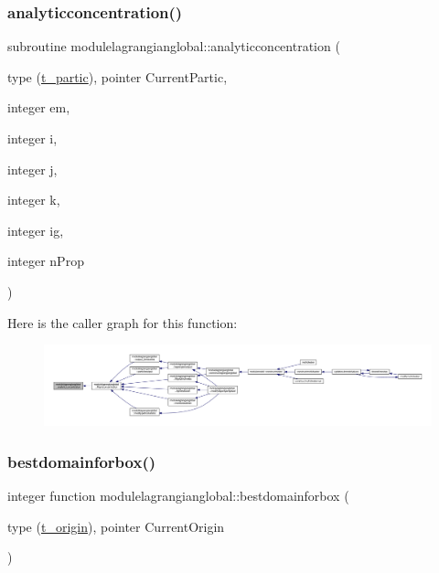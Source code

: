 \subsubsection{\texorpdfstring{analyticconcentration()}{analyticconcentration()}}
{\footnotesize\ttfamily subroutine modulelagrangianglobal\+::analyticconcentration (\begin{DoxyParamCaption}\item[{type (\mbox{\hyperlink{structmodulelagrangianglobal_1_1t__partic}{t\+\_\+partic}}), pointer}]{Current\+Partic,  }\item[{integer}]{em,  }\item[{integer}]{i,  }\item[{integer}]{j,  }\item[{integer}]{k,  }\item[{integer}]{ig,  }\item[{integer}]{n\+Prop }\end{DoxyParamCaption})\hspace{0.3cm}{\ttfamily [private]}}

Here is the caller graph for this function\+:\nopagebreak
\begin{figure}[H]
\begin{center}
\leavevmode
\includegraphics[width=350pt]{namespacemodulelagrangianglobal_a8a4e3b4aa0ee023ec48a0d9e44b5df43_icgraph}
\end{center}
\end{figure}
\mbox{\label{namespacemodulelagrangianglobal_a88f19e8e5a4b9ce0cfe45715a5e96dbc}} 
\subsubsection{\texorpdfstring{bestdomainforbox()}{bestdomainforbox()}}
{\footnotesize\ttfamily integer function modulelagrangianglobal\+::bestdomainforbox (\begin{DoxyParamCaption}\item[{type (\mbox{\hyperlink{structmodulelagrangianglobal_1_1t__origin}{t\+\_\+origin}}), pointer}]{Current\+Origin }\end{DoxyParamCaption})\hspace{0.3cm}{\ttfamily [private]}}

